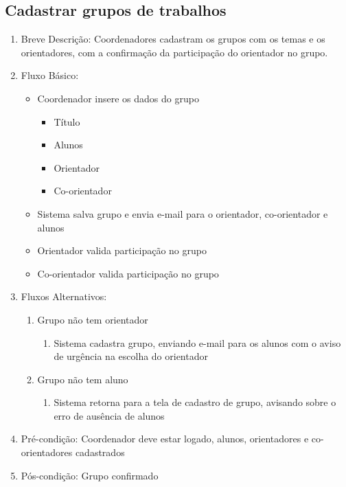 \subsection{Cadastrar grupos de trabalhos}
\begin{enumerate}
    \item Breve Descrição: Coordenadores cadastram os grupos com os temas e os orientadores, com a confirmação da participação do orientador no grupo.
    \item Fluxo Básico:
    \begin{itemize}
        \item Coordenador insere os dados do grupo
        \begin{itemize}
            \item Título
            \item Alunos
            \item Orientador
            \item Co-orientador
        \end{itemize}
        \item Sistema salva grupo e envia e-mail para o orientador, co-orientador e alunos
        \item Orientador valida participação no grupo
        \item Co-orientador valida participação no grupo
    \end{itemize}
    \item Fluxos Alternativos:
    \begin{enumerate}
        \item Grupo não tem orientador
        \begin{enumerate}
            \item Sistema cadastra grupo, enviando e-mail para os alunos com o aviso de urgência na escolha do orientador
        \end{enumerate}
        \item Grupo não tem aluno
        \begin{enumerate}
            \item Sistema retorna para a tela de cadastro de grupo, avisando sobre o erro de ausência de alunos
        \end{enumerate}
    \end{enumerate}
    \item Pré-condição: Coordenador deve estar logado, alunos, orientadores e co-orientadores cadastrados
    \item Pós-condição: Grupo confirmado
\end{enumerate}

